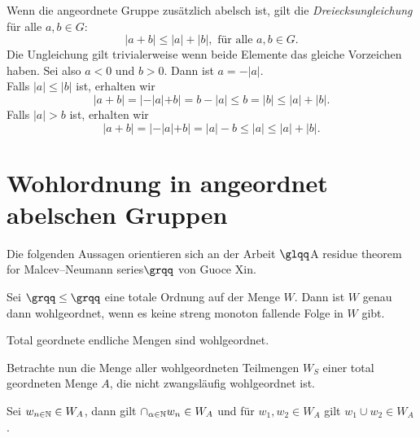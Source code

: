 Wenn die angeordnete Gruppe zusätzlich abelsch ist, gilt die \textit{Dreiecksungleichung} für alle $a, b \in G$:
\[|a+ b | \le |a| + |b|, \text{ für alle } a, b \in G.\]
Die Ungleichung gilt trivialerweise wenn beide Elemente das gleiche Vorzeichen haben. Sei also $a < 0$ und $b > 0$. Dann ist $a= -|a|$.\\
Falls $|a|\le |b|$ ist, erhalten wir
\[ |a + b |= |-|a|+b| = b - |a| \le b = |b|\le|a| + |b|. \]
Falls $|a| >b$ ist, erhalten wir 
\[|a+b| = |-|a| +b| = |a| - b \le |a|\le |a| + |b|.\]                                                                                                                       
%

\section{Wohlordnung in angeordnet abelschen Gruppen}
Die folgenden Aussagen orientieren sich an der Arbeit $\glqq$A residue theorem for Malcev--Neumann series$\grqq$ von Guoce Xin.
\begin{satz}\label{wohlgeordnetabnehmendeFolge} 
Sei $\grqq\le\grqq$ eine totale Ordnung auf der Menge $W$. Dann ist $W$ genau dann wohlgeordnet, wenn es keine streng monoton fallende Folge in $W$ gibt.
\end{satz}
%
\begin{bsp}\label{TotalGeordnetEndlichIstWOhlgeordnet}
Total geordnete endliche Mengen sind wohlgeordnet.
\end{bsp}
Betrachte nun die Menge aller wohlgeordneten Teilmengen $W_S$ einer total geordneten Menge $A$, die nicht zwangsläufig wohlgeordnet ist. 
\begin{lemma}\label{wohlgeordnvereinigung} %
Sei $w_{n\in \mathbb{N}} \in W_A$, dann gilt $\cap_{\alpha \in \mathbb{N}} w_n \in W_A$ und für $w_1, w_2 \in W_A$ gilt $w_1 \cup w_2 \in W_A$.
\end{lemma}
